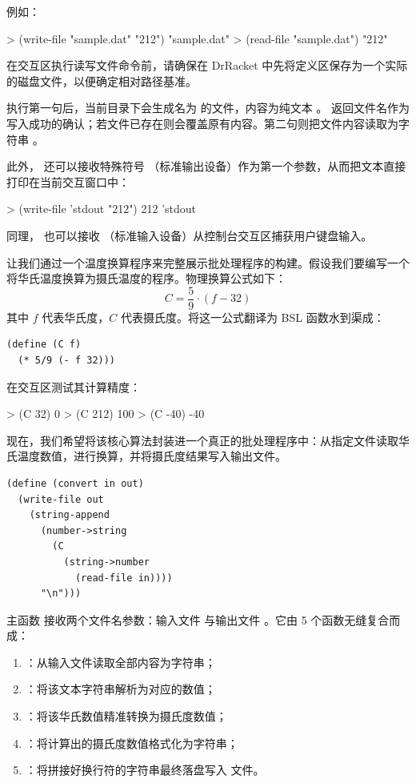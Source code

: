 例如：
\begin{replbox}
> (write-file "sample.dat" "212")
"sample.dat"
> (read-file "sample.dat")
"212"
\end{replbox}

\begin{notebox}[文件路径安全提示]
在交互区执行读写文件命令前，请确保在 DrRacket 中先将定义区保存为一个实际的磁盘文件，以便确定相对路径基准。
\end{notebox}

执行第一句后，当前目录下会生成名为  的文件，内容为纯文本 。 返回文件名作为写入成功的确认；若文件已存在则会覆盖原有内容。第二句则把文件内容读取为字符串 。

此外， 还可以接收特殊符号 （标准输出设备）作为第一个参数，从而把文本直接打印在当前交互窗口中：
\begin{replbox}
> (write-file 'stdout "212\n")
212
'stdout
\end{replbox}
同理， 也可以接收 （标准输入设备）从控制台交互区捕获用户键盘输入。

让我们通过一个温度换算程序来完整展示批处理程序的构建。假设我们要编写一个将华氏温度换算为摄氏温度的程序。物理换算公式如下：
\[
  C = \frac{5}{9} \cdot (f - 32)
\]
其中 $f$ 代表华氏度，$C$ 代表摄氏度。将这一公式翻译为 BSL 函数水到渠成：
\begin{lstlisting}[language=BSL]
(define (C f)
  (* 5/9 (- f 32)))
\end{lstlisting}
在交互区测试其计算精度：
\begin{replbox}
> (C 32)
0
> (C 212)
100
> (C -40)
-40
\end{replbox}

现在，我们希望将该核心算法封装进一个真正的批处理程序中：从指定文件读取华氏温度数值，进行换算，并将摄氏度结果写入输出文件。

\begin{lstlisting}[language=BSL]
(define (convert in out)
  (write-file out
    (string-append
      (number->string
        (C
          (string->number
            (read-file in))))
      "\n")))
\end{lstlisting}

主函数  接收两个文件名参数：输入文件  与输出文件 。它由 5 个函数无缝复合而成：
\begin{enumerate}
  \item {}：从输入文件读取全部内容为字符串；
  \item {}：将该文本字符串解析为对应的数值；
  \item {}：将该华氏数值精准转换为摄氏度数值；
  \item {}：将计算出的摄氏度数值格式化为字符串；
  \item {}：将拼接好换行符的字符串最终落盘写入  文件。
\end{enumerate}

